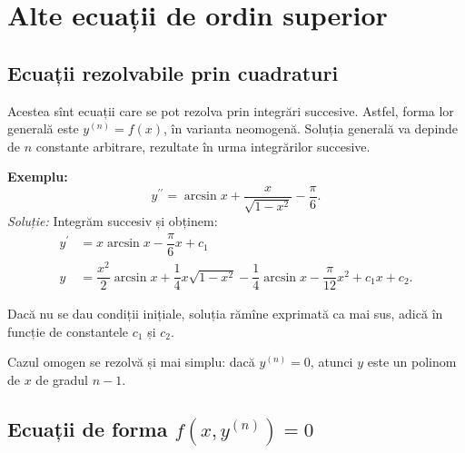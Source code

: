 
\chapter{Alte ecuații de ordin superior}

\section{Ecuații rezolvabile prin cuadraturi}

\indent\indent Acestea sînt ecuații care se pot rezolva prin integrări
succesive. Astfel, forma lor generală este $ y^{(n)} = f(x) $, în varianta
neomogenă. Soluția generală va depinde de $ n $ constante arbitrare,
rezultate în urma integrărilor succesive.

\textbf{Exemplu:}
\[
  y^{\prime\prime} = \arcsin x + \frac{x}{\sqrt{1 - x^2}} - \frac{\pi}{6}.
\]
\emph{Soluție:} Integrăm succesiv și obținem:
\begin{align*}
  y^{\prime} &= x \arcsin x - \dfrac{\pi}{6} x + c_1 \\
  y &= \dfrac{x^2}{2} \arcsin x + \dfrac{1}{4}x \sqrt{1 - x^2} - %
  \dfrac{1}{4} \arcsin x - \dfrac{\pi}{12} x^2 + c_1 x + c_2.
\end{align*}

Dacă nu se dau condiții inițiale, soluția rămîne exprimată ca mai sus,
adică în funcție de constantele $ c_1 $ și $ c_2 $.

\vspace{1cm}

Cazul omogen se rezolvă și mai simplu: dacă $ y^{(n)} = 0 $, atunci
$ y $ este un polinom de $ x $ de gradul $ n - 1 $.


\section{Ecuații de forma $ f(x, y^{(n)}) = 0 $}

